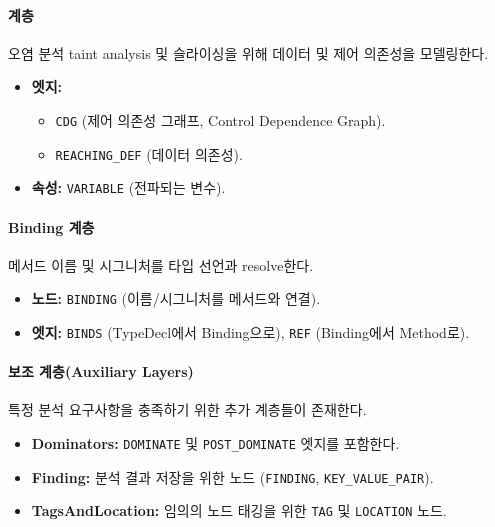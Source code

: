 \paragraph{\abbrPDG 계층} 오염 분석 taint analysis 및 슬라이싱을 위해 데이터 및 제어 의존성을 모델링한다.
\begin{itemize} \setlength{\itemsep}{0pt} \setlength{\parskip}{0pt} \setlength{\topsep}{0pt} \setlength{\partopsep}{0pt}
    \item \textbf{엣지:} 
    \begin{itemize} \setlength{\itemsep}{0pt} \setlength{\parskip}{0pt} \setlength{\topsep}{0pt} \setlength{\partopsep}{0pt}
        \item \texttt{CDG} (제어 의존성 그래프, Control Dependence Graph).
        \item \texttt{REACHING\_DEF} (데이터 의존성).
    \end{itemize}
    \item \textbf{속성:} \texttt{VARIABLE} (전파되는 변수).
\end{itemize}

\paragraph{Binding 계층} 메서드 이름 및 시그니처를 타입 선언과 resolve한다.
\begin{itemize} \setlength{\itemsep}{0pt} \setlength{\parskip}{0pt} \setlength{\topsep}{0pt} \setlength{\partopsep}{0pt}
    \item \textbf{노드:} \texttt{BINDING} (이름/시그니처를 메서드와 연결).
    \item \textbf{엣지:} \texttt{BINDS} (TypeDecl에서 Binding으로), \texttt{REF} (Binding에서 Method로).
\end{itemize}

\paragraph{보조 계층(Auxiliary Layers)} 특정 분석 요구사항을 충족하기 위한 추가 계층들이 존재한다.
\begin{itemize} \setlength{\itemsep}{0pt} \setlength{\parskip}{0pt} \setlength{\topsep}{0pt} \setlength{\partopsep}{0pt}
    \item \textbf{Dominators:} \texttt{DOMINATE} 및 \texttt{POST\_DOMINATE} 엣지를 포함한다.
    \item \textbf{Finding:} 분석 결과 저장을 위한 노드 (\texttt{FINDING}, \texttt{KEY\_VALUE\_PAIR}).
    \item \textbf{TagsAndLocation:} 임의의 노드 태깅을 위한 \texttt{TAG} 및 \texttt{LOCATION} 노드.
\end{itemize}

